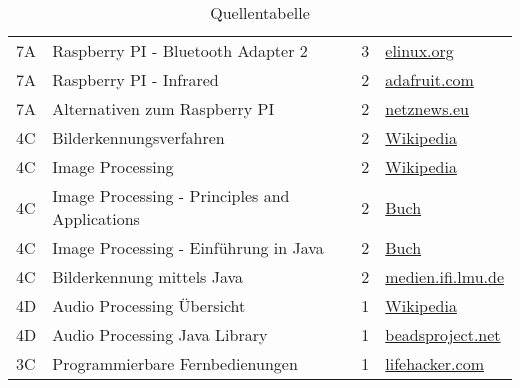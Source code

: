 \begin{table}[h!]
\begin{tabular}{l l l l}
        7A & Raspberry PI - Bluetooth Adapter 2 & 3 & \href{http://elinux.org/RPi_USB_Bluetooth_adapters}{elinux.org} \\
        
        7A & Raspberry PI - Infrared & 2 & \href{https://learn.adafruit.com/using-an-ir-remote-with-a-raspberry-pi-media-center/overview}{adafruit.com} \\
        
        7A & Alternativen zum Raspberry PI & 2 &
        \href{http://www.netznews.eu/10-raspberry-pi-alternativen-im-kurzportraet/}{netznews.eu} \\
        
        4C & Bilderkennungsverfahren & 2 & \href{http://en.wikipedia.org/wiki/Outline_of_object_recognition}{Wikipedia} \\
        
        4C & Image Processing & 2 & \href{http://en.wikipedia.org/wiki/Image_processing}{Wikipedia} \\
        
        4C & Image Processing - Principles and Applications & 2 & \href{http://books.google.co.in/books?id=smBw4-xvfrIC&lpg=PP1&dq=image\%20processing\%20ajoy\%20ray&pg=PP1#v=onepage&q=&f=false}{Buch} \\
        
        4C & Image Processing - Einführung in Java & 2 & \href{ http://imagingbook.com/}{Buch} \\
      
        4C & Bilderkennung mittels Java & 2 & \href{https://www.medien.ifi.lmu.de/lehre/ss07/mt/mtB3b.pdf}{medien.ifi.lmu.de} \\

        4D & Audio Processing Übersicht & 1 & \href{http://en.wikipedia.org/wiki/Audio_signal_processing}{Wikipedia} \\
        
        4D & Audio Processing Java Library & 1 & \href{http://www.beadsproject.net/}{beadsproject.net} \\
        
        3C & Programmierbare Fernbedienungen & 1 & \href{http://lifehacker.com/5901930/five-best-universal-remote-controls}{lifehacker.com} \\
        
	\end{tabular}
	\caption{Quellentabelle}
	\label{tab:quelle}
\end{table}
